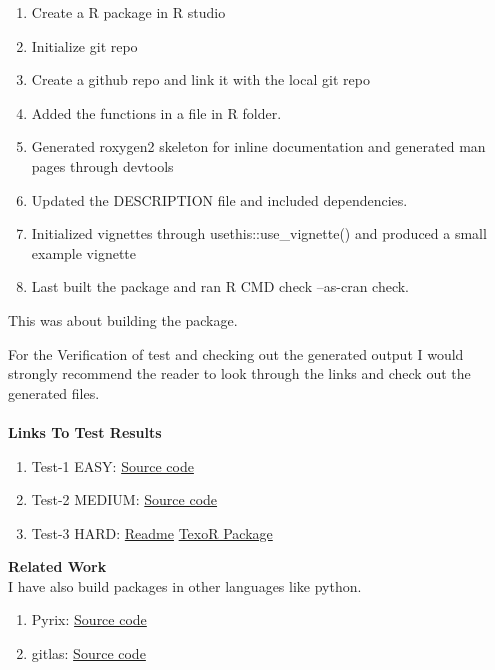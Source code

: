 \documentclass[12pt]{article}
\begin{document}
\begin{enumerate}[label = {  \color{MediumBlue} \textbf{\arabic*. }},align=left]
\begin{enumerate}[label = {  \color{MediumBlue} \textbf{\arabic*. }},align=left]
\item Create a R package in R studio
\item Initialize git repo
\item Create a github repo and link it with the local git repo
\item Added the functions in a file in R folder.
\item Generated roxygen2 skeleton for inline documentation and generated man pages through devtools
\item Updated the DESCRIPTION file and included dependencies.
\item Initialized vignettes through usethis::use\_vignette() and produced a small example vignette
\item Last built the package and ran R CMD check --as-cran check.
\end{enumerate}
This was about building the package.
\end{enumerate}
For the Verification of test and checking out the generated output I would strongly recommend the reader to look through the links and check out the generated files.\\
\\
{\large\bfseries Links To Test Results}
\begin{enumerate}[label = {  \color{MediumBlue} \textbf{\arabic*. }},align=left]
 \item {\color{MediumBlue} Test-1 EASY}: \href{https://github.com/Abhi-1U/GSoC_22_R_Converting-past-R-Journal-articles-to-HTML/tree/main/Test-1}{\color{orange}Source code}
 \item {\color{MediumBlue} Test-2 MEDIUM}: \href{https://github.com/Abhi-1U/GSoC_22_R_Converting-past-R-Journal-articles-to-HTML/tree/main/Test-2}{\color{orange}Source code}
 \item {\color{MediumBlue} Test-3 HARD}: \href{https://github.com/Abhi-1U/GSoC_22_R_Converting-past-R-Journal-articles-to-HTML/tree/main/Test-3}{\color{orange}Readme} \href{https://github.com/Abhi-1U/TexoR}{\color{orange}TexoR Package} 
\end{enumerate}
{\large\bfseries Related Work}\\
I have also build packages in other languages like python.
 \begin{enumerate}[label = {  \color{MediumBlue} \textbf{\arabic*. }},align=left]
 \item Pyrix: \href{https://github.com/Abhi-1U/pyrix}{\color{orange}Source code} 
 \item gitlas: \href{https://github.com/Abhi-1U/gitlas}{\color{orange}Source code} 
\end{enumerate}


\end{document}
